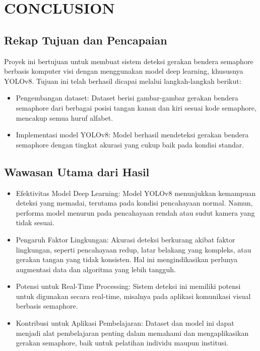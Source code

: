 \documentclass[12pt,a4paper]{article}
\begin{document}
\section{CONCLUSION}
\begin{adjustwidth}{3em}{0pt}
\subsection{Rekap Tujuan dan Pencapaian}
\hspace{0.5cm} Proyek ini bertujuan untuk membuat sistem deteksi gerakan bendera semaphore berbasis komputer visi dengan menggunakan model deep learning, khususnya YOLOv8. Tujuan ini telah berhasil dicapai melalui langkah-langkah berikut:
\begin{itemize}
    \item Pengembangan dataset: Dataset berisi gambar-gambar gerakan bendera semaphore dari berbagai posisi tangan kanan dan kiri sesuai kode semaphore, mencakup semua huruf alfabet.
    \item Implementasi model YOLOv8: Model berhasil mendeteksi gerakan bendera semaphore dengan tingkat akurasi yang cukup baik pada kondisi standar.
\end{itemize}

\subsection{Wawasan Utama dari Hasil}
\begin{itemize}
    \item Efektivitas Model Deep Learning: Model YOLOv8 menunjukkan kemampuan deteksi yang memadai, terutama pada kondisi pencahayaan normal. Namun, performa model menurun pada pencahayaan rendah atau sudut kamera yang tidak sesuai.
    \item Pengaruh Faktor Lingkungan: Akurasi deteksi berkurang akibat faktor lingkungan, seperti pencahayaan redup, latar belakang yang kompleks, atau gerakan tangan yang tidak konsisten. Hal ini mengindikasikan perlunya augmentasi data dan algoritma yang lebih tangguh.
    \item Potensi untuk Real-Time Processing: Sistem deteksi ini memiliki potensi untuk digunakan secara real-time, misalnya pada aplikasi komunikasi visual berbasis semaphore.
    \item Kontribusi untuk Aplikasi Pembelajaran: Dataset dan model ini dapat menjadi alat pembelajaran penting dalam memahami dan mengaplikasikan gerakan semaphore, baik untuk pelatihan individu maupun institusi.
\end{itemize}


\end{adjustwidth}
\end{document}
